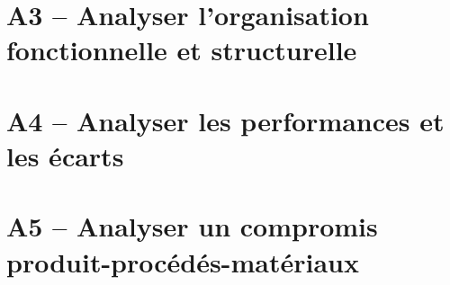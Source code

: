 \section{A3 -- Analyser l'organisation fonctionnelle et structurelle}

\section{A4 -- Analyser les performances et les écarts}

\section{A5 -- Analyser un compromis produit-procédés-matériaux}



\proffalse
\begin{multicols}{2}







\end{multicols}
%
%
%
%
%
%
%
